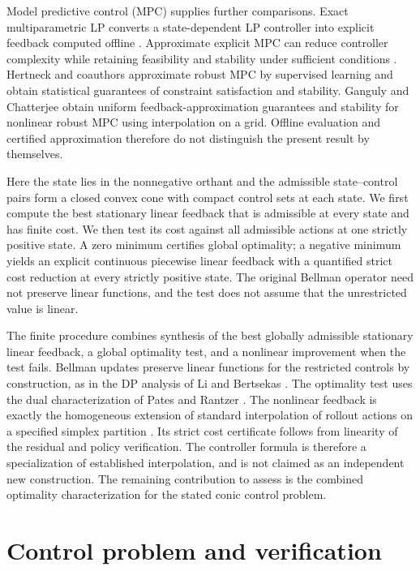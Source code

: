 \documentclass[10pt]{article}
\begin{document}
Model predictive control (MPC) supplies further comparisons. Exact multiparametric LP converts a state-dependent LP controller into explicit feedback computed offline \cite{bemporad-borrelli-morari}. Approximate explicit MPC can reduce controller complexity while retaining feasibility and stability under sufficient conditions \cite{bemporad-filippi-2003,rubagotti-2012}. Hertneck and coauthors \cite{hertneck-2018} approximate robust MPC by supervised learning and obtain statistical guarantees of constraint satisfaction and stability. Ganguly and Chatterjee \cite{ganguly-2025} obtain uniform feedback-approximation guarantees and stability for nonlinear robust MPC using interpolation on a grid. Offline evaluation and certified approximation therefore do not distinguish the present result by themselves.

Here the state lies in the nonnegative orthant and the admissible state--control pairs form a closed convex cone with compact control sets at each state. We first compute the best stationary linear feedback that is admissible at every state and has finite cost. We then test its cost against all admissible actions at one strictly positive state. A zero minimum certifies global optimality; a negative minimum yields an explicit continuous piecewise linear feedback with a quantified strict cost reduction at every strictly positive state. The original Bellman operator need not preserve linear functions, and the test does not assume that the unrestricted value is linear.

The finite procedure combines synthesis of the best globally admissible stationary linear feedback, a global optimality test, and a nonlinear improvement when the test fails. Bellman updates preserve linear functions for the restricted controls by construction, as in the DP analysis of Li and Bertsekas \cite{li-bertsekas}. The optimality test uses the dual characterization of Pates and Rantzer \cite{pates-rantzer}. The nonlinear feedback is exactly the homogeneous extension of standard interpolation of rollout actions on a specified simplex partition \cite[Section~3.1]{bemporad-filippi-2006}. Its strict cost certificate follows from linearity of the residual and policy verification. The controller formula is therefore a specialization of established interpolation, and is not claimed as an independent new construction. The remaining contribution to assess is the combined optimality characterization for the stated conic control problem.

\section{Control problem and verification}
\end{document}
